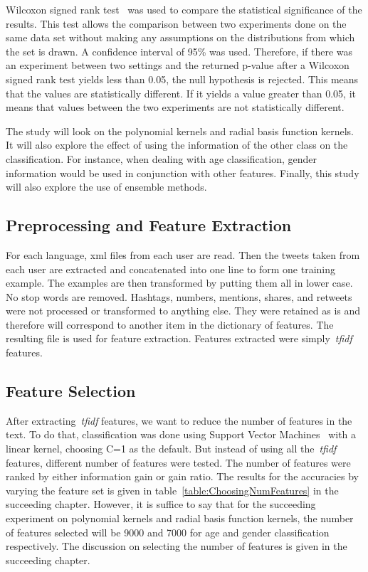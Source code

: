 \documentclass[a4paper]{llncs}
\begin{document}
Wilcoxon signed rank test~\cite{wilcoxon1945individual} was used to compare the statistical significance of the results. This test allows the comparison between two experiments done on the same data set without making any assumptions on the distributions from which the set is drawn. A confidence interval of 95\% was used. Therefore, if there was an experiment between two settings and the returned p-value after a Wilcoxon signed rank test yields less than 0.05, the null hypothesis is rejected. This means that the values are statistically different. If it yields a value greater than 0.05, it means that values between the two experiments are not statistically different. 

The study will look on the polynomial kernels and radial basis function kernels. It will also explore the effect of using the information of the other class on the classification. For instance, when dealing with age classification, gender information would be used in conjunction with other features. Finally, this study will also explore the use of ensemble methods. 

\subsection{Preprocessing and Feature Extraction}
For each language, xml files from each user are read. Then the tweets taken from each user are extracted and concatenated into one line to form one training example. The examples are then transformed by putting them all in lower case. No stop words are removed. Hashtags, numbers, mentions, shares, and retweets were not processed or transformed to anything else. They were retained as is and therefore will correspond to another item in the dictionary of features. The resulting file is used for feature extraction.  Features extracted were simply~\textit{tfidf} features.  


\subsection{Feature Selection}
After extracting~\textit{tfidf} features, we want to reduce the number of features in the text. To do that, classification was done using Support Vector Machines~\cite{cortes1995support} with a linear kernel, choosing C=1 as the default. But instead of using all the~\textit{tfidf} features, different number of features were tested. The number of features were ranked by either information gain or gain ratio. The results for the accuracies by varying the feature set is given in table~\ref{table:ChoosingNumFeatures} in the succeeding chapter. However, it is suffice to say that for the succeeding experiment on polynomial kernels and radial basis function kernels, the number of features selected will be 9000 and 7000 for age and gender classification respectively. The discussion on selecting the number of features is given in the succeeding chapter. 
\end{document}
